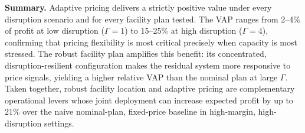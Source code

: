 \medskip
\noindent\textbf{Summary.}
Adaptive pricing delivers a strictly positive value under every
disruption scenario and for every facility plan tested.
The VAP ranges from 2--4\% of profit at low disruption ($\Gamma = 1$)
to 15--25\% at high disruption ($\Gamma = 4$), confirming that pricing
flexibility is most critical precisely when capacity is most stressed.
The robust facility plan amplifies this benefit: its concentrated,
disruption-resilient configuration makes the residual system more
responsive to price signals, yielding a higher relative VAP than the
nominal plan at large $\Gamma$.
Taken together, robust facility location and adaptive pricing are
complementary operational levers whose joint deployment can increase
expected profit by up to 21\% over the naive nominal-plan,
fixed-price baseline in high-margin, high-disruption settings.
